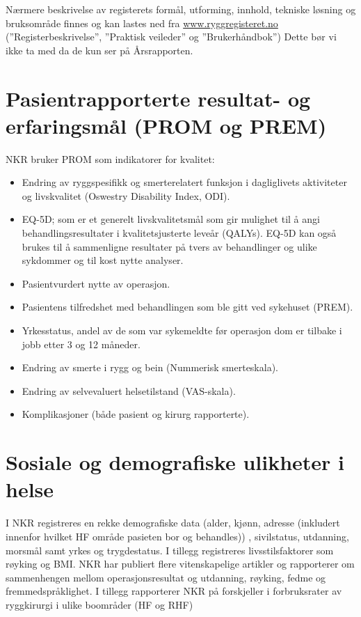 \documentclass[norsk, a4paper, twocolumn]{report}
\begin{document}
Nærmere beskrivelse av registerets formål, utforming, innhold, tekniske løsning og bruksområde finnes og kan lastes ned fra \url{www.ryggregisteret.no} (”Registerbeskrivelse”, ”Praktisk veileder” og ”Brukerhåndbok”)   Dette bør vi ikke ta med da de kun ser på Årsrapporten. 


\section{Pasientrapporterte resultat- og erfaringsmål (PROM og PREM)}\label{sec:pasutk}

NKR bruker PROM som indikatorer for kvalitet:
\begin{itemize}
	\item Endring av ryggspesifikk og smerterelatert funksjon i dagliglivets 
    aktiviteter og livskvalitet (Oswestry Disability Index, ODI).
	\item EQ-5D; som er et generelt livskvalitetsmål som gir mulighet til å angi 
    behandlingsresultater i kvalitetsjusterte leveår (QALYs). EQ-5D kan også brukes 
    til å sammenligne resultater på tvers av behandlinger og ulike sykdommer og til 
    kost nytte analyser.
	\item Pasientvurdert nytte av operasjon.
	\item Pasientens tilfredshet med behandlingen som ble gitt ved sykehuset (PREM).
	\item Yrkesstatus, andel av de som var sykemeldte før operasjon dom er tilbake i 
    jobb etter 3 og 12 måneder.
	\item Endring av smerte i rygg og bein (Nummerisk smerteskala).
	\item Endring av selvevaluert helsetilstand (VAS-skala).
	\item Komplikasjoner (både pasient og kirurg rapporterte).
\end{itemize}


\section{Sosiale og demografiske ulikheter i helse}\label{sec:sosdem}

I NKR registreres en rekke demografiske data (alder, kjønn, adresse (inkludert innenfor hvilket HF område pasieten bor og behandles)) , sivilstatus, utdanning, morsmål samt yrkes og trygdestatus. I tillegg registreres livsstilsfaktorer som røyking og BMI. NKR har publiert flere vitenskapelige artikler  og rapporterer om sammenhengen mellom operasjonsresultat og utdanning, røyking, fedme og fremmedspråklighet. I tillegg rapporterer NKR på forskjeller i forbruksrater av ryggkirurgi i ulike boområder (HF og RHF) 
\end{document}
